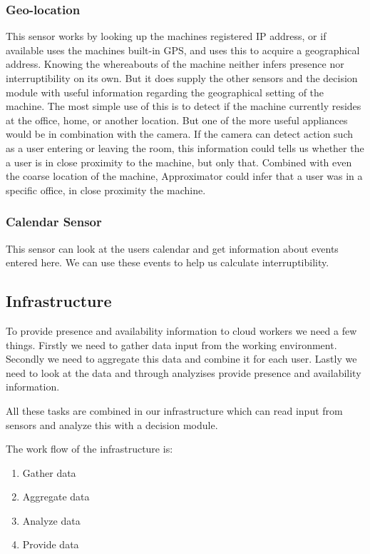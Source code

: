 \documentclass{sigchi}
\begin{document}
\subsubsection{Geo-location}
This sensor works by looking up the machines registered IP address, or if available uses the machines built-in GPS, and uses this to acquire a geographical address.
Knowing the whereabouts of the machine neither infers presence nor interruptibility on its own.
But it does supply the other sensors and the decision module with useful information regarding the geographical setting of the machine.
The most simple use of this is to detect if the machine currently resides at the office, home, or another location.
But one of the more useful appliances would be in combination with the camera.
If the camera can detect action such as a user entering or leaving the room, this information could tells us whether the a user is in close proximity to the machine, but only that.
Combined with even the coarse location of the machine, Approximator could infer that a user was in a specific office, in close proximity the machine.

\subsubsection{Calendar Sensor}
This sensor can look at the users calendar and get information about events entered here.
We can use these events to help us calculate interruptibility.

\subsection{Infrastructure}
To provide presence and availability information to cloud workers we need a few things.
Firstly we need to gather data input from the working environment.
Secondly we need to aggregate this data and combine it for each user.
Lastly we need to look at the data and through analyzises provide presence and availability information.

All these tasks are combined in our infrastructure which can read input from sensors and analyze this with a decision module.

The work flow of the infrastructure is:
\begin{enumerate}
  \item Gather data
  \item Aggregate data
  \item Analyze data
  \item Provide data
\end{enumerate}
\end{document}
